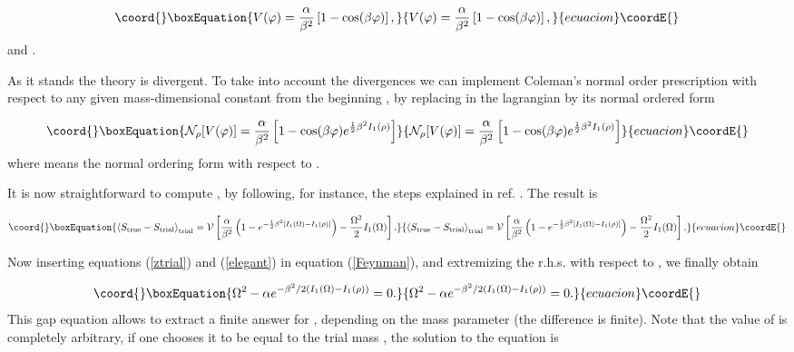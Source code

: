 \documentclass[a4paper,12pt]{article}
\begin{document}
\begin{equation}\coord{}\boxEquation{
V(\varphi)=\frac{\alpha}{\beta^2}\left[1-\cos(\beta\varphi)\right],
}{
V(\varphi)=\frac{\alpha}{\beta^2}\left[1-\cos(\beta\varphi)\right],
}{ecuacion}\coordE{}\end{equation}
and \coordHE{}.

As it stands the theory is divergent. To take into account the divergences we can
implement Coleman's normal order prescription \cite{Coleman} with respect to any given
mass-dimensional constant \myHighlight{$\rho$}\coordHE{} from the beginning \cite{beg}, by replacing in the
lagrangian \coordHE{} by its normal ordered form

\begin{equation}\coord{}\boxEquation{
\N_\rho[V(\varphi)]=\frac{\alpha}{\beta^2}\left[1-\cos(\beta\varphi)e^{\unmedio\beta^2
I_1(\rho)}\right]
}{
\N_\rho[V(\varphi)]=\frac{\alpha}{\beta^2}\left[1-\cos(\beta\varphi)e^{\unmedio\beta^2
I_1(\rho)}\right]
}{ecuacion}\coordE{}\end{equation}
where \myHighlight{$\N_\rho[...]$}\coordHE{} means the normal ordering form with respect
to \myHighlight{$\rho$}\coordHE{}.

It is now straightforward to compute \coordHE{}, by following, for instance, the steps explained in ref.
\cite{Li-Naon}. The result is

\begin{equation}\coord{}\boxEquation{\label{elegant}
\bra S\true-S\trial \ket\trial =
\V\left[\frac{\alpha}{\beta^2}\left(1-e^{-\unmedio\beta^2[I_1(\Omega)-I_1(\rho)]}\right)
-\frac{\Omega^2}{2}I_1(\Omega)\right].
}{\bra S\true-S\trial \ket\trial =
\V\left[\frac{\alpha}{\beta^2}\left(1-e^{-\unmedio\beta^2[I_1(\Omega)-I_1(\rho)]}\right)
-\frac{\Omega^2}{2}I_1(\Omega)\right].
}{ecuacion}\coordE{}\end{equation}

\noindent Now inserting equations (\ref{ztrial}) and
(\ref{elegant}) in equation (\ref{Feynman}), and extremizing the
r.h.s. with respect to \myHighlight{$\Omega$}\coordHE{}, we finally obtain

\begin{equation}\coord{}\boxEquation{\label{gapscha}
\Omega^2-\alpha e^{-\beta^2/2 (I_1(\Omega)-I_1(\rho))}=0.
}{\Omega^2-\alpha e^{-\beta^2/2 (I_1(\Omega)-I_1(\rho))}=0.
}{ecuacion}\coordE{}\end{equation}
This gap equation allows to extract a finite answer for \myHighlight{$\Omega$}\coordHE{}, depending on the
mass parameter \myHighlight{$\rho$}\coordHE{} (the difference \coordHE{} is finite). Note that
the value of \myHighlight{$\rho$}\coordHE{} is completely arbitrary, if one chooses it to be equal to the
trial mass \myHighlight{$\Omega$}\coordHE{}, the solution to the equation is
\end{document}
